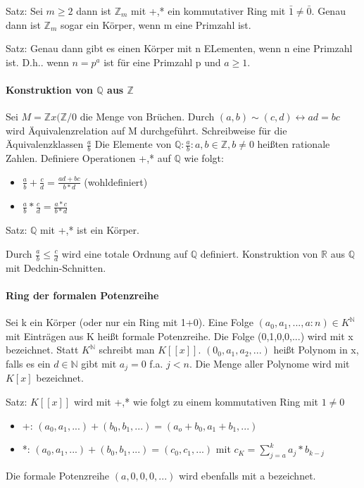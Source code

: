 \documentclass[10pt,landscape]{article}
\begin{document}
\begin{multicols}{3}
Satz: Sei $m\geq 2$ dann ist $\mathbb{Z}_m$ mit +,* ein kommutativer Ring mit $\bar{1}\not=\bar{0}$. Genau dann ist $\mathbb{Z}_m$ sogar ein Körper, wenn m eine Primzahl ist.

Satz: Genau dann gibt es einen Körper mit n ELementen, wenn n eine Primzahl ist. D.h.. wenn $n=p^a$ ist für eine Primzahl p und $a\geq 1$.

\paragraph{Konstruktion von $\mathbb{Q}$ aus $\mathbb{Z}$}
Sei $M=\mathbb{Z} x(\mathbb{Z} /{0}$ die Menge von Brüchen. Durch $(a,b)\sim (c,d)\leftrightarrow ad=bc$ wird Äquivalenzrelation auf M durchgeführt. Schreibweise für die Äquivalenzklassen $\frac{a}{b}$ Die Elemente von $\mathbb{Q} :{\frac{a}{b}:a,b\in\mathbb{Z}, b\not=0}$ heißten rationale Zahlen.
Definiere Operationen +,* auf $\mathbb{Q}$ wie folgt:
\begin{itemize}
    \item $\frac{a}{b}+\frac{c}{d} = \frac{ad+bc}{b*d}$ (wohldefiniert)
    \item $\frac{a}{b}*\frac{c}{d} = \frac{a*c}{b*d}$
\end{itemize}

Satz: $\mathbb{Q}$ mit +,* ist ein Körper.

Durch $\frac{a}{b}\leq\frac{c}{d}$ wird eine totale Ordnung auf $\mathbb{Q}$ definiert. Konstruktion von $\mathbb{R}$ aus $\mathbb{Q}$ mit Dedchin-Schnitten.

\paragraph{Ring der formalen Potenzreihe}
Sei k ein Körper (oder nur ein Ring mit 1+0). Eine Folge $(a_0, a_1,...,a:n)\in K^{\mathbb{N}}$ mit Einträgen aus K heißt formale Potenzreihe. Die Folge (0,1,0,0,...) wird mit x bezeichnet. Statt $K^{\mathbb{N}}$ schreibt man $K[[x]]$. $(0_0,a_1,a_2,...)$ heißt Polynom in x, falls es ein $d\in \mathbb{N}$ gibt mit $a_j=0$ f.a. $j<n$. Die Menge aller Polynome wird mit $K[x]$ bezeichnet.

Satz: $K[[x]]$ wird mit +,* wie folgt zu einem kommutativen Ring mit $1\not=0$
\begin{itemize}
    \item +: $(a_0,a_1,...) + (b_0,b_1,...) = (a_o+b_0, a_1+b_1, ...)$
    \item *: $(a_0,a_1,...) + (b_0,b_1,...) = (c_0, c_1,...)$ mit $c_K=\sum_{j=a}^{k} a_j*b_{k-j}$
\end{itemize}
Die formale Potenzreihe $(a,0,0,0,...)$ wird ebenfalls mit a bezeichnet.


\end{multicols}
\end{document}
